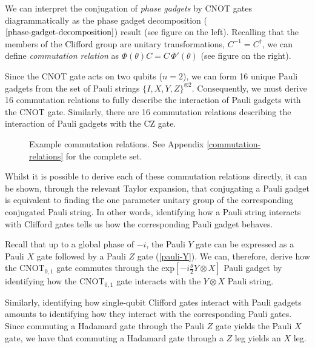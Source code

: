 We can interpret the conjugation of \textit{phase gadgets} by CNOT gates diagrammatically as the phase gadget decomposition ($\ref{phase-gadget-decomposition}$) result (see figure on the left). Recalling that the members of the Clifford group are unitary transformations, $C^{-1} = C^\dagger$, we can define \textit{commutation relation} as $\Phi(\theta) C = C \, \Phi'(\theta)$ (see figure on the right).


Since the CNOT gate acts on two qubits ($n=2$), we can form 16 unique Pauli gadgets from the set of Pauli strings $\{I, X, Y, Z\}^{\otimes 2}$. Consequently, we must derive 16 commutation relations to fully describe the interaction of Pauli gadgets with the CNOT gate. Similarly, there are 16 commutation relations describing the interaction of Pauli gadgets with the CZ gate.

\begin{figure}[H]
    \centering
    \caption{Example commutation relations. See Appendix \ref{commutation-relations} for the complete set.}
\end{figure}

Whilst it is possible to derive each of these commutation relations directly, it can be shown, through the relevant Taylor expansion, that conjugating a Pauli gadget is equivalent to finding the one parameter unitary group of the corresponding conjugated Pauli string. In other words, identifying how a Pauli string interacts with Clifford gates tells us how the corresponding Pauli gadget behaves.

Recall that up to a global phase of $-i$, the Pauli $Y$ gate can be expressed as a Pauli $X$ gate followed by a Pauli $Z$ gate (\ref{pauli-Y}). We can, therefore, derive how the $\text{CNOT}_{0, 1}$ gate commutes through the $\text{exp} \left[ - i\frac{\theta}{2} Y \otimes X \right]$ Pauli gadget by identifying how the CNOT$_{0, 1}$ gate interacts with the $Y \otimes X$ Pauli string.


Similarly, identifying how single-qubit Clifford gates interact with Pauli gadgets amounts to identifying how they interact with the corresponding Pauli gates. Since commuting a Hadamard gate through the Pauli $Z$ gate yields the Pauli $X$ gate, we have that commuting a Hadamard gate through a $Z$ leg yields an $X$ leg.

